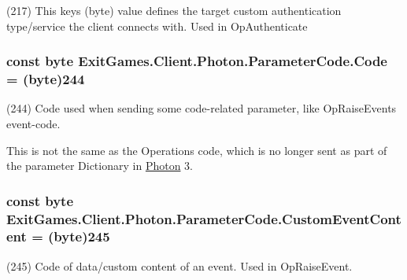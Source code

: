 (217) This key\textquotesingle{}s (byte) value defines the target custom authentication type/service the client connects with. Used in Op\+Authenticate

\subsubsection[{\texorpdfstring{Code}{Code}}]{\setlength{\rightskip}{0pt plus 5cm}const byte Exit\+Games.\+Client.\+Photon.\+Parameter\+Code.\+Code = (byte)244}\hypertarget{class_exit_games_1_1_client_1_1_photon_1_1_parameter_code_aba38939b84deab55de596db4d7f13d6e}{}\label{class_exit_games_1_1_client_1_1_photon_1_1_parameter_code_aba38939b84deab55de596db4d7f13d6e}


(244) Code used when sending some code-\/related parameter, like Op\+Raise\+Event\textquotesingle{}s event-\/code. 

This is not the same as the Operation\textquotesingle{}s code, which is no longer sent as part of the parameter Dictionary in \hyperlink{namespace_exit_games_1_1_client_1_1_photon}{Photon} 3.
\subsubsection[{\texorpdfstring{Custom\+Event\+Content}{CustomEventContent}}]{\setlength{\rightskip}{0pt plus 5cm}const byte Exit\+Games.\+Client.\+Photon.\+Parameter\+Code.\+Custom\+Event\+Content = (byte)245}\hypertarget{class_exit_games_1_1_client_1_1_photon_1_1_parameter_code_a170f80778c72f6090e53334c5fe05e3d}{}\label{class_exit_games_1_1_client_1_1_photon_1_1_parameter_code_a170f80778c72f6090e53334c5fe05e3d}


(245) Code of data/custom content of an event. Used in Op\+Raise\+Event.

